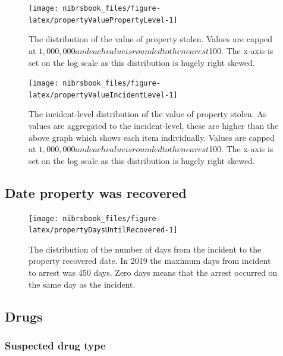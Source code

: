 \documentclass[
  12pt,
  openany]{book}
\begin{document}
\begin{figure}

{\centering \texttt{[image: nibrsbook\_files/figure-latex/propertyValuePropertyLevel-1]} 

}

\caption{The distribution of the value of property stolen. Values are capped at $1,000,000 and each value is rounded to the nearest $100. The x-axis is set on the log scale as this distribution is hugely right skewed.}\label{fig:propertyValuePropertyLevel}
\end{figure}

\begin{figure}

{\centering \texttt{[image: nibrsbook\_files/figure-latex/propertyValueIncidentLevel-1]} 

}

\caption{The incident-level distribution of the value of property stolen. As values are aggregated to the incident-level, these are higher than the above graph which shows each item individually. Values are capped at $1,000,000 and each value is rounded to the nearest $100. The x-axis is set on the log scale as this distribution is hugely right skewed.}\label{fig:propertyValueIncidentLevel}
\end{figure}

\hypertarget{date-property-was-recovered}{%
\subsection{Date property was recovered}\label{date-property-was-recovered}}

\begin{figure}

{\centering \texttt{[image: nibrsbook\_files/figure-latex/propertyDaysUntilRecovered-1]} 

}

\caption{The distribution of the number of days from the incident to the property recovered date. In 2019 the maximum days from incident to arrest was 450 days. Zero days means that the arrest occurred on the same day as the incident. }\label{fig:propertyDaysUntilRecovered}
\end{figure}

\hypertarget{drugs}{%
\subsection{Drugs}\label{drugs}}

\hypertarget{suspected-drug-type}{%
\subsubsection{Suspected drug type}\label{suspected-drug-type}}
\end{document}
